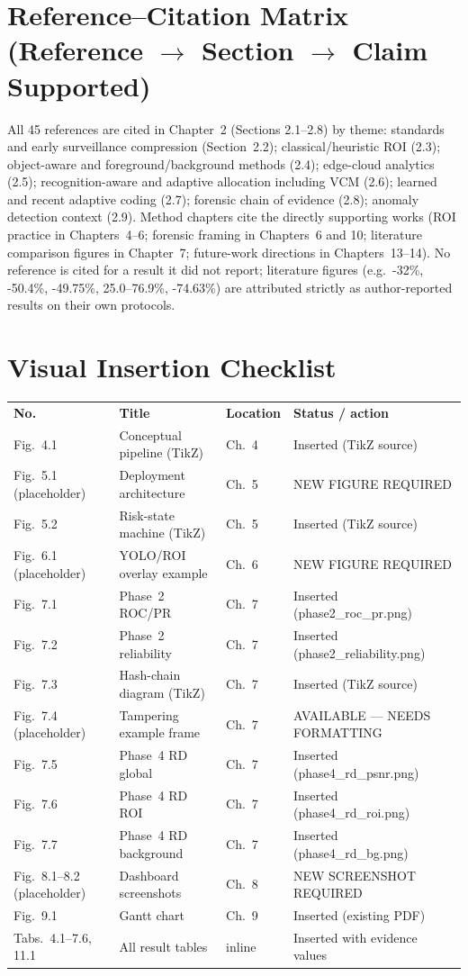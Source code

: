 \section{Reference--Citation Matrix (Reference $\rightarrow$ Section $\rightarrow$ Claim Supported)}

All 45 references are cited in Chapter~2 (Sections 2.1--2.8) by theme: standards and early surveillance compression (Section~2.2); classical/heuristic ROI (2.3); object-aware and foreground/background methods (2.4); edge-cloud analytics (2.5); recognition-aware and adaptive allocation including VCM (2.6); learned and recent adaptive coding (2.7); forensic chain of evidence (2.8); anomaly detection context (2.9). Method chapters cite the directly supporting works (ROI practice in Chapters~4--6; forensic framing in Chapters~6 and 10; literature comparison figures in Chapter~7; future-work directions in Chapters~13--14). No reference is cited for a result it did not report; literature figures (e.g.\ -32\%, -50.4\%, -49.75\%, 25.0--76.9\%, -74.63\%) are attributed strictly as author-reported results on their own protocols.

\section{Visual Insertion Checklist}

\begin{longtable}{@{}llll@{}}
\textbf{No.} & \textbf{Title} & \textbf{Location} & \textbf{Status / action} \\
Fig.~4.1 & Conceptual pipeline (TikZ) & Ch.~4 & Inserted (TikZ source) \\
Fig.~5.1 (placeholder) & Deployment architecture & Ch.~5 & NEW FIGURE REQUIRED \\
Fig.~5.2 & Risk-state machine (TikZ) & Ch.~5 & Inserted (TikZ source) \\
Fig.~6.1 (placeholder) & YOLO/ROI overlay example & Ch.~6 & NEW FIGURE REQUIRED \\
Fig.~7.1 & Phase~2 ROC/PR & Ch.~7 & Inserted (phase2\_roc\_pr.png) \\
Fig.~7.2 & Phase~2 reliability & Ch.~7 & Inserted (phase2\_reliability.png) \\
Fig.~7.3 & Hash-chain diagram (TikZ) & Ch.~7 & Inserted (TikZ source) \\
Fig.~7.4 (placeholder) & Tampering example frame & Ch.~7 & AVAILABLE --- NEEDS FORMATTING \\
Fig.~7.5 & Phase~4 RD global & Ch.~7 & Inserted (phase4\_rd\_psnr.png) \\
Fig.~7.6 & Phase~4 RD ROI & Ch.~7 & Inserted (phase4\_rd\_roi.png) \\
Fig.~7.7 & Phase~4 RD background & Ch.~7 & Inserted (phase4\_rd\_bg.png) \\
Fig.~8.1--8.2 (placeholder) & Dashboard screenshots & Ch.~8 & NEW SCREENSHOT REQUIRED \\
Fig.~9.1 & Gantt chart & Ch.~9 & Inserted (existing PDF) \\
Tabs.~4.1--7.6, 11.1 & All result tables & inline & Inserted with evidence values \\
\end{longtable}

